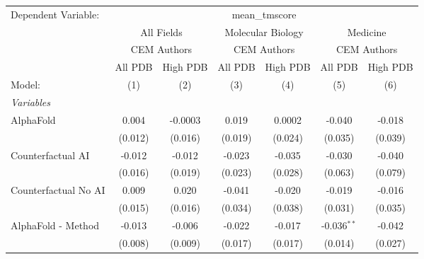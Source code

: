 \begingroup
\centering
\begin{tabular}{lcccccc}
   \tabularnewline \midrule \midrule
   Dependent Variable: & \multicolumn{6}{c}{mean\_tmscore}\\
 & \multicolumn{2}{c}{All Fields} & \multicolumn{2}{c}{Molecular Biology} & \multicolumn{2}{c}{Medicine} \\
\cmidrule(lr){2-3} \cmidrule(lr){4-5} \cmidrule(lr){6-7}
 & \multicolumn{2}{c}{CEM Authors} & \multicolumn{2}{c}{CEM Authors} & \multicolumn{2}{c}{CEM Authors} \\
\cmidrule(lr){2-3} \cmidrule(lr){4-5} \cmidrule(lr){6-7}
 & \multicolumn{1}{c}{All PDB} & \multicolumn{1}{c}{High PDB} & \multicolumn{1}{c}{All PDB} & \multicolumn{1}{c}{High PDB} & \multicolumn{1}{c}{All PDB} & \multicolumn{1}{c}{High PDB} \\
\cmidrule(lr){2-2} \cmidrule(lr){3-3} \cmidrule(lr){4-4} \cmidrule(lr){5-5} \cmidrule(lr){6-6} \cmidrule(lr){7-7}
   Model:                                                     & (1)         & (2)         & (3)     & (4)     & (5)           & (6)\\  
   \midrule
   \emph{Variables}\\
   AlphaFold                                                  & 0.004       & -0.0003     & 0.019   & 0.0002  & -0.040        & -0.018\\   
                                                              & (0.012)     & (0.016)     & (0.019) & (0.024) & (0.035)       & (0.039)\\   
   Counterfactual AI                                          & -0.012      & -0.012      & -0.023  & -0.035  & -0.030        & -0.040\\   
                                                              & (0.016)     & (0.019)     & (0.023) & (0.028) & (0.063)       & (0.079)\\   
   Counterfactual No AI                                       & 0.009       & 0.020       & -0.041  & -0.020  & -0.019        & -0.016\\   
                                                              & (0.015)     & (0.016)     & (0.034) & (0.038) & (0.031)       & (0.035)\\   
   AlphaFold - Method                                         & -0.013      & -0.006      & -0.022  & -0.017  & -0.036$^{**}$ & -0.042\\   
                                                              & (0.008)     & (0.009)     & (0.017) & (0.017) & (0.014)       & (0.027)\\   

\end{tabular}
